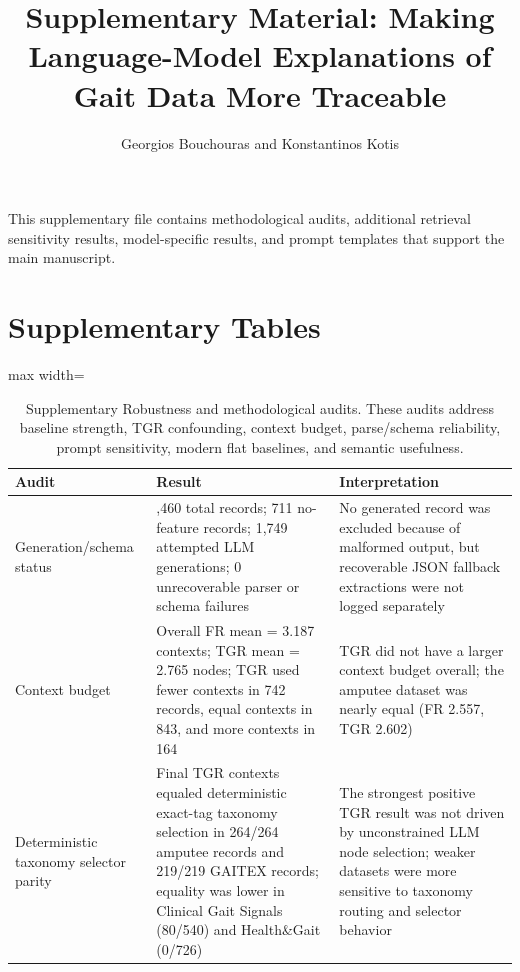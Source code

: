 \documentclass{article}
\begin{document}
\title{Supplementary Material: Making Language-Model Explanations of Gait Data More Traceable}
\author{Georgios Bouchouras and Konstantinos Kotis}
\date{}
\maketitle

This supplementary file contains methodological audits, additional retrieval sensitivity results, model-specific results, and prompt templates that support the main manuscript.

\section*{Supplementary Tables}

\begin{table}[!ht]
\caption{Supplementary Robustness and methodological audits. These audits address baseline strength, TGR confounding, context budget, parse/schema reliability, prompt sensitivity, modern flat baselines, and semantic usefulness.}
\label{stab:methodology-audits}
\centering
\scriptsize
\begin{adjustbox}{max width=\textwidth}
\begin{tabular}{@{}>{\raggedright\arraybackslash}p{}>{\raggedright\arraybackslash}p{}>{\raggedright\arraybackslash}p{}@{}}
\toprule
Audit & Result & Interpretation \\
\midrule
Generation/schema status & 2,460 total records; 711 no-feature records; 1,749 attempted LLM generations; 0 unrecoverable parser or schema failures & No generated record was excluded because of malformed output, but recoverable JSON fallback extractions were not logged separately \\
Context budget & Overall FR mean = 3.187 contexts; TGR mean = 2.765 nodes; TGR used fewer contexts in 742 records, equal contexts in 843, and more contexts in 164 & TGR did not have a larger context budget overall; the amputee dataset was nearly equal (FR 2.557, TGR 2.602) \\
Deterministic taxonomy selector parity & Final TGR contexts equaled deterministic exact-tag taxonomy selection in 264/264 amputee records and 219/219 GAITEX records; equality was lower in Clinical Gait Signals (80/540) and Health\&Gait (0/726) & The strongest positive TGR result was not driven by unconstrained LLM node selection; weaker datasets were more sensitive to taxonomy routing and selector behavior \\

\end{tabular}
\end{adjustbox}
\end{table}
\end{document}
